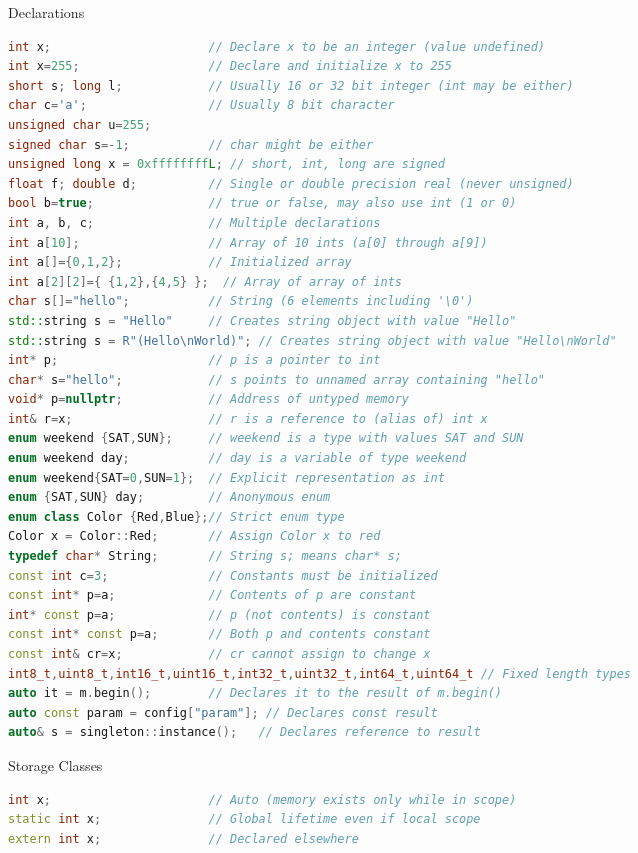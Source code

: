 \documentclass[final]{beamer}
\begin{document}
\begin{frame}[t,fragile]
\begin{columns}[t,totalwidth=\paperwidth, colsep=0.015\paperwidth]
\begin{column}{0.32\paperwidth}
\begin{block}{Declarations}
\begin{lstlisting}[language=C++]
int x;                      // Declare x to be an integer (value undefined)
int x=255;                  // Declare and initialize x to 255
short s; long l;            // Usually 16 or 32 bit integer (int may be either)
char c='a';                 // Usually 8 bit character
unsigned char u=255;
signed char s=-1;           // char might be either
unsigned long x = 0xffffffffL; // short, int, long are signed
float f; double d;          // Single or double precision real (never unsigned)
bool b=true;                // true or false, may also use int (1 or 0)
int a, b, c;                // Multiple declarations
int a[10];                  // Array of 10 ints (a[0] through a[9])
int a[]={0,1,2};            // Initialized array
int a[2][2]={ {1,2},{4,5} };  // Array of array of ints
char s[]="hello";           // String (6 elements including '\0')
std::string s = "Hello"     // Creates string object with value "Hello"
std::string s = R"(Hello\nWorld)"; // Creates string object with value "Hello\nWorld"
int* p;                     // p is a pointer to int
char* s="hello";            // s points to unnamed array containing "hello"
void* p=nullptr;            // Address of untyped memory
int& r=x;                   // r is a reference to (alias of) int x
enum weekend {SAT,SUN};     // weekend is a type with values SAT and SUN
enum weekend day;           // day is a variable of type weekend
enum weekend{SAT=0,SUN=1};  // Explicit representation as int
enum {SAT,SUN} day;         // Anonymous enum
enum class Color {Red,Blue};// Strict enum type
Color x = Color::Red;       // Assign Color x to red
typedef char* String;       // String s; means char* s;
const int c=3;              // Constants must be initialized
const int* p=a;             // Contents of p are constant
int* const p=a;             // p (not contents) is constant
const int* const p=a;       // Both p and contents constant
const int& cr=x;            // cr cannot assign to change x
int8_t,uint8_t,int16_t,uint16_t,int32_t,uint32_t,int64_t,uint64_t // Fixed length types
auto it = m.begin();        // Declares it to the result of m.begin()
auto const param = config["param"]; // Declares const result
auto& s = singleton::instance();   // Declares reference to result
\end{lstlisting}
\end{block}

\begin{block}{Storage Classes}
\begin{lstlisting}[language=C++]
int x;                      // Auto (memory exists only while in scope)
static int x;               // Global lifetime even if local scope
extern int x;               // Declared elsewhere
\end{lstlisting}
\end{block}


\end{column}
\end{columns}
\end{frame}
\end{document}
